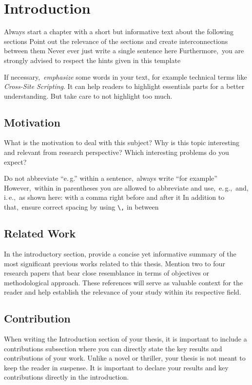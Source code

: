 \chapter{Introduction} \label{chap:intro}
Always start a chapter with a short but informative text about the following sections Point out the relevance of the sections and create interconnections between them Never ever just write a single sentence here Furthermore,\ you are strongly advised to respect the hints given in this template

If necessary,\ \emph{emphasize} some words in your text, for example technical terms like \emph{Cross-Site Scripting}.
It can help readers to highlight essentials parts for a better understanding.
But take care to not highlight too much.

\section{Motivation}
What is the motivation to deal with this subject?
Why is this topic interesting and relevant from research perspective?
Which interesting problems do you expect?

Do not abbreviate \enquote{e.\,g.\/} within a sentence,\ always write \enquote{for example} However,\ within in parentheses you are allowed to abbreviate and use,\ e.\,g.,\ and, i.\,e.,\ as shown here: with a comma right before and after it In addition to that,\ ensure correct spacing by using \texttt{\textbackslash,} in between

\section{Related Work}

In the introductory section, provide a concise yet informative summary of the most significant previous works related to this thesis. Mention two to four research papers that bear close resemblance in terms of objectives or methodological approach. These references will serve as valuable context for the reader and help establish the relevance of your study within its respective field.

\section{Contribution}
\label{sec:Contribution}

When writing the Introduction section of your thesis, it is important to include a contributions subsection where you can directly state the key results and contributions of your work. Unlike a novel or thriller, your thesis is not meant to keep the reader in suspense. It is important to declare your results and key contributions directly in the introduction.

